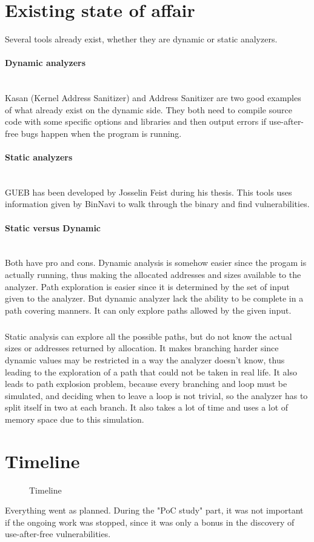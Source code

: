 \documentclass[a4paper, 12pt]{report}
\newcommand{\myparagraph}[1]{\paragraph{#1}\mbox{}\newline\\}
\begin{document}
\section*{Existing state of affair}
Several tools already exist, whether they are dynamic or static analyzers.
\myparagraph{Dynamic analyzers}
Kasan (Kernel Address Sanitizer) and Address Sanitizer are two good examples of what already exist on the dynamic side. They both need to
compile source code with some specific options and libraries and then output errors if use-after-free bugs happen when the program is running.
\myparagraph{Static analyzers}
GUEB has been developed by Josselin Feist during his thesis. This tools uses information given by BinNavi to walk through the binary and
find vulnerabilities.
\myparagraph{Static versus Dynamic}
Both have pro and cons. Dynamic analysis is somehow easier since the progam is actually running, thus making the allocated addresses and
sizes available to the analyzer. Path exploration is easier since it is determined by the set of input given to the analyzer. But dynamic
analyzer lack the ability to be complete in a path covering manners. It can only explore paths allowed by the given input.
\subparagraph{}
Static analysis can explore all the possible paths, but do not know the actual sizes or addresses returned by allocation. It makes branching
harder since dynamic values may be restricted in a way the analyzer doesn't know, thus leading to the exploration of a path that could not
be taken in real life. It also leads to path explosion problem, because every branching and loop must be simulated, and deciding when to
leave a loop is not trivial, so the analyzer has to split itself in two at each branch. It also takes a lot of time and uses a lot of
memory space due to this simulation.

\newpage
\section*{Timeline}
\begin{figure}[h]
\begin{center}
    \newline
    \caption{Timeline}
\end{center}
\end{figure}
Everything went as planned. During the "PoC study" part, it was not important if the ongoing work was stopped, since it was only a
bonus in the discovery of use-after-free vulnerabilities.
\end{document}
